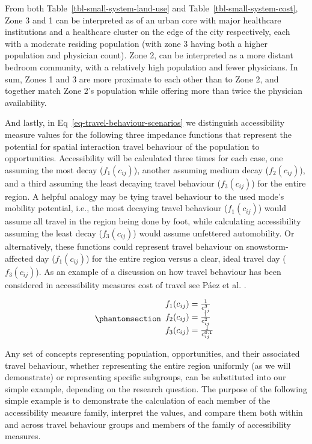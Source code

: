 \documentclass[
  10pt,
  letterpaper,
]{article}
\begin{document}
From both Table~\ref{tbl-small-system-land-use} and
Table~\ref{tbl-small-system-cost}, Zone 3 and 1 can be interpreted as of
an urban core with major healthcare institutions and a healthcare
cluster on the edge of the city respectively, each with a moderate
residing population (with zone 3 having both a higher population and
physician count). Zone 2, can be interpreted as a more distant bedroom
community, with a relatively high population and fewer physicians. In
sum, Zones 1 and 3 are more proximate to each other than to Zone 2, and
together match Zone 2's population while offering more than twice the
physician availability.

And lastly, in Eq~\ref{eq-travel-behaviour-scenarios} we distinguish
accessibility measure values for the following three impedance functions
that represent the potential for spatial interaction travel behaviour of
the population to opportunities. Accessibility will be calculated three
times for each case, one assuming the most decay (\(f_1(c_{ij})\)),
another assuming medium decay (\(f_2(c_{ij})\)), and a third assuming
the least decaying travel behaviour (\(f_3(c_{ij})\)) for the entire
region. A helpful analogy may be tying travel behaviour to the used
mode's mobility potential, i.e., the most decaying travel behaviour
(\(f_1(c_{ij})\)) would assume all travel in the region being done by
foot, while calculating accessibility assuming the least decay
(\(f_3(c_{ij})\)) would assume unfettered automobility. Or
alternatively, these functions could represent travel behaviour on
snowstorm-affected day (\(f_1(c_{ij})\)) for the entire region versus a
clear, ideal travel day (\(f_3(c_{ij})\)). As an example of a discussion
on how travel behaviour has been considered in accessibility measures
cost of travel see Páez et al. \citep{paez2012measuring}.

\begin{equation}\phantomsection\label{eq-travel-behaviour-scenarios}{
\begin{array}{l}
f_1(c_{ij}) = \frac{1}{c_{ij}^3}\\
f_2(c_{ij}) = \frac{1}{c_{ij}^2}\\
f_3(c_{ij}) = \frac{1}{c_{ij}^{0.1}}
\end{array}
}\end{equation}

Any set of concepts representing population, opportunities, and their
associated travel behaviour, whether representing the entire region
uniformly (as we will demonstrate) or representing specific subgroups,
can be substituted into our simple example, depending on the research
question. The purpose of the following simple example is to demonstrate
the calculation of each member of the accessibility measure family,
interpret the values, and compare them both within and across travel
behaviour groups and members of the family of accessibility measures.
\end{document}
